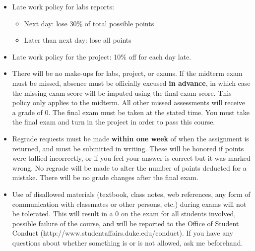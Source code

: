 \documentclass[11pt, a4paper]{article}
\begin{document}
\begin{itemize}

\item Late work policy for labs reports:
 
 \begin{itemize}
 
  \item Next day: lose 30\% of total possible points
  \item Later than next day: lose all points
 
 \end{itemize}
 
 \item  Late work policy for the project: 10\% off for each day late.
 \item There will be no make-ups for labs, 
project, or exams. If the midterm exam must be missed, absence must be officially
excused \textbf{in advance}, in which case the missing exam score will be imputed using the final
exam score. This policy only applies to the midterm. All other missed assessments will
receive a grade of 0. The final exam must be taken at the stated time. You must take the
final exam and turn in the project in order to pass this course.
\item Regrade requests must be made \textbf{within one week} of when the assignment is returned,
and must be submitted in writing. These will be honored if points were tallied incorrectly, or
if you feel your answer is correct but it was marked wrong. No regrade will be made to alter
the number of points deducted for a mistake. There will be no grade changes after the final
exam.
\item Use of disallowed materials (textbook, class notes, web references, any form of
communication with classmates or other persons, etc.) during exams will not be tolerated.
This will result in a 0 on the exam for all students involved, possible failure of the course,
and will be reported to the Office of Student Conduct
(http://www.studentaffairs.duke.edu/conduct). If you have any questions about whether something is or is not allowed, ask me beforehand.

\end{itemize}

\end{document}
